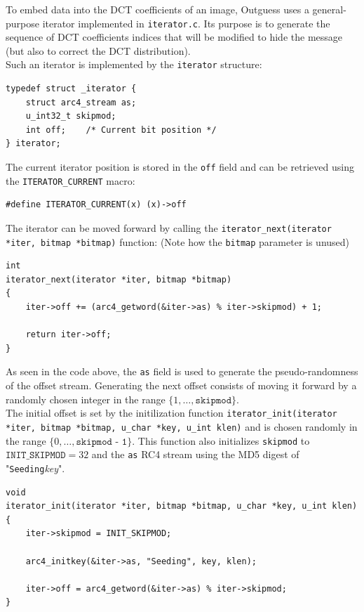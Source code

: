 \documentclass{article}
\begin{document}
To embed data into the DCT coefficients of an image, Outguess uses a general-purpose iterator implemented in \texttt{iterator.c}. Its purpose is to generate the sequence of DCT coefficients indices that will be modified to hide the message (but also to correct the DCT distribution). \\

Such an iterator is implemented by the \texttt{iterator} structure:
\begin{verbatim}
typedef struct _iterator {
	struct arc4_stream as;
	u_int32_t skipmod;
	int off;    /* Current bit position */
} iterator;
\end{verbatim}

The current iterator position is stored in the \texttt{off} field and can be retrieved using the \texttt{ITERATOR\_CURRENT} macro:
\begin{verbatim}
#define ITERATOR_CURRENT(x) (x)->off
\end{verbatim}

The iterator can be moved forward by calling the \texttt{iterator\_next(iterator *iter, bitmap *bitmap)} function: (Note how the \texttt{bitmap} parameter is unused)
\begin{verbatim}
int
iterator_next(iterator *iter, bitmap *bitmap)
{
	iter->off += (arc4_getword(&iter->as) % iter->skipmod) + 1;
	
	return iter->off;
}
\end{verbatim}

As seen in the code above, the \texttt{as} field is used to generate the pseudo-randomness of the offset stream. Generating the next offset consists of moving it forward by a randomly chosen integer in the range $\{ 1, \ldots, \texttt{skipmod} \}$. \\

The initial offset is set by the initilization function \texttt{iterator\_init(iterator *iter, bitmap *bitmap, u\_char *key, u\_int klen)} and is chosen randomly in the range $\{ 0, \ldots, \texttt{skipmod - 1} \}$. This function also initializes \texttt{skipmod} to $\texttt{INIT\_SKIPMOD} = 32$ and the \texttt{as} RC4 stream using the MD5 digest of "\texttt{Seeding}\textit{key}".

\begin{verbatim}
void
iterator_init(iterator *iter, bitmap *bitmap, u_char *key, u_int klen)
{
	iter->skipmod = INIT_SKIPMOD;
	
	arc4_initkey(&iter->as, "Seeding", key, klen);
	
	iter->off = arc4_getword(&iter->as) % iter->skipmod;
}
\end{verbatim}
\end{document}

